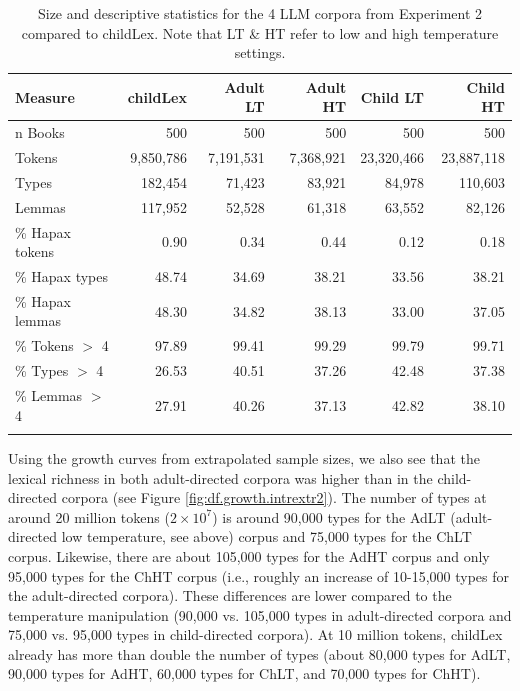 \documentclass[doc, a4paper]{apa7}
\begin{document}
\begin{table}[!htbp]
\caption{Size and descriptive statistics for the 4 LLM corpora from Experiment 2 compared to childLex. Note that LT \& HT refer to low and high temperature settings.}
\centering
\begin{tabular}{lrrrrr}
  \hline
    Measure & childLex & Adult LT & Adult HT & Child LT & Child HT \\ 
  \hline
n Books & 500 & 500 & 500 & 500 & 500 \\ 
  Tokens & 9,850,786 & 7,191,531 & 7,368,921 & 23,320,466 & 23,887,118 \\ 
  Types & 182,454 & 71,423 & 83,921 & 84,978 & 110,603 \\ 
  Lemmas & 117,952 & 52,528 & 61,318 & 63,552 & 82,126 \\ 
  \% Hapax tokens & 0.90 & 0.34 & 0.44 & 0.12 & 0.18 \\ 
  \% Hapax types & 48.74 & 34.69 & 38.21 & 33.56 & 38.21 \\ 
  \% Hapax lemmas & 48.30 & 34.82 & 38.13 & 33.00 & 37.05 \\ 
  \% Tokens $>$ 4 & 97.89 & 99.41 & 99.29 & 99.79 & 99.71 \\ 
  \% Types $>$ 4 & 26.53 & 40.51 & 37.26 & 42.48 & 37.38 \\ 
  \% Lemmas $>$ 4 & 27.91 & 40.26 & 37.13 & 42.82 & 38.10 \\ 
   \hline \\
\end{tabular}
\label{freqComp2}
\end{table}



Using the growth curves from extrapolated sample sizes, we also see that the lexical richness in both adult-directed corpora was higher than in the child-directed corpora (see Figure \ref{fig:df.growth.intrextr2}). The number of types at around 20 million tokens ($2 \times 10^7$) is around 90,000 types for the AdLT (adult-directed low temperature, see above) corpus and 75,000 types for the ChLT corpus. Likewise, there are about 105,000 types for the AdHT corpus and only 95,000 types for the ChHT corpus (i.e., roughly an increase of 10-15,000 types for the adult-directed corpora). These differences are lower compared to the temperature manipulation (90,000 vs. 105,000 types in adult-directed corpora and 75,000 vs. 95,000 types in child-directed corpora). At 10 million tokens, childLex already has more than double the number of types (about 80,000 types for AdLT, 90,000 types for AdHT, 60,000 types for ChLT, and 70,000 types for ChHT). 
\end{document}

